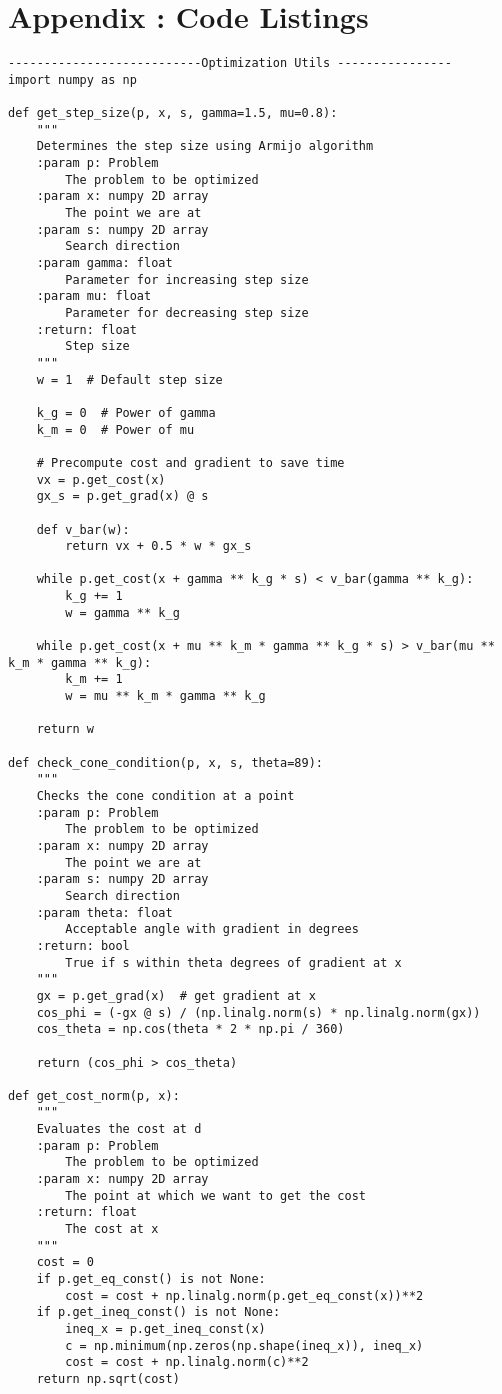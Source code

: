 \clearpage
\section{Appendix : Code Listings}
\begin{lstlisting}
---------------------------Optimization Utils ----------------
import numpy as np

def get_step_size(p, x, s, gamma=1.5, mu=0.8):
    """
    Determines the step size using Armijo algorithm
    :param p: Problem
        The problem to be optimized
    :param x: numpy 2D array
        The point we are at
    :param s: numpy 2D array
        Search direction
    :param gamma: float
        Parameter for increasing step size
    :param mu: float
        Parameter for decreasing step size
    :return: float
        Step size
    """
    w = 1  # Default step size

    k_g = 0  # Power of gamma
    k_m = 0  # Power of mu

    # Precompute cost and gradient to save time
    vx = p.get_cost(x)
    gx_s = p.get_grad(x) @ s

    def v_bar(w):
        return vx + 0.5 * w * gx_s

    while p.get_cost(x + gamma ** k_g * s) < v_bar(gamma ** k_g):
        k_g += 1
        w = gamma ** k_g

    while p.get_cost(x + mu ** k_m * gamma ** k_g * s) > v_bar(mu ** k_m * gamma ** k_g):
        k_m += 1
        w = mu ** k_m * gamma ** k_g

    return w

def check_cone_condition(p, x, s, theta=89):
    """
    Checks the cone condition at a point
    :param p: Problem
        The problem to be optimized
    :param x: numpy 2D array
        The point we are at
    :param s: numpy 2D array
        Search direction
    :param theta: float
        Acceptable angle with gradient in degrees
    :return: bool
        True if s within theta degrees of gradient at x
    """
    gx = p.get_grad(x)  # get gradient at x
    cos_phi = (-gx @ s) / (np.linalg.norm(s) * np.linalg.norm(gx))
    cos_theta = np.cos(theta * 2 * np.pi / 360)

    return (cos_phi > cos_theta)

def get_cost_norm(p, x):
    """
    Evaluates the cost at d
    :param p: Problem
        The problem to be optimized
    :param x: numpy 2D array
        The point at which we want to get the cost
    :return: float
        The cost at x
    """
    cost = 0
    if p.get_eq_const() is not None:
        cost = cost + np.linalg.norm(p.get_eq_const(x))**2
    if p.get_ineq_const() is not None:
        ineq_x = p.get_ineq_const(x)
        c = np.minimum(np.zeros(np.shape(ineq_x)), ineq_x)
        cost = cost + np.linalg.norm(c)**2
    return np.sqrt(cost)


\end{lstlisting}
